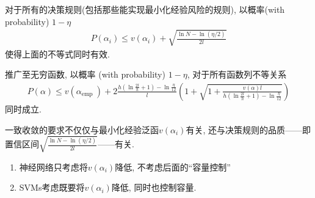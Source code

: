 \documentclass[compress,10pt,dvipsnames,notheorems]{beamer} %
\begin{document}
\begin{frame}
\begin{solu}
对于所有的决策规则(包括那些能实现最小化经验风险的规则), 以概率(with probability) $1-\eta$
\begin{align*}
P\left(\alpha_{i}\right) \leq v\left(\alpha_{i}\right)+\sqrt{\frac{\ln N-\ln (\eta / 2)}{2 l}}
\end{align*}
使得上面的不等式同时有效.
\end{solu}
\begin{solu}
推广至无穷函数, 以概率 (with probability) $1- \eta$, 对于所有函数列不等关系
\begin{align*}
P(\alpha) \leq v\left(\alpha_{\text {emp }}\right) + 2 \frac{h\left(\ln \frac{2 l}{h}+1\right)-\ln \frac{\eta}{12}}{l}\left(1+\sqrt{1+\frac{v(\alpha) l}{h\left(\ln \frac{2 l}{h}+1\right)-\ln \frac{\eta}{12}}}\right)
\end{align*}
同时成立.
\end{solu}
\begin{solu}
一致收敛的要求不仅仅与最小化经验泛函$v(\alpha_{i})$有关, 还与决策规则的品质——即置信区间$\sqrt{\frac{\ln N-\ln (\eta / 2)}{2 l}}$——有关.
\end{solu}
\begin{solu}
\begin{enumerate}
\item 神经网络只考虑将$v(\alpha_{i})$降低, 不考虑后面的“容量控制”
\item SVMs考虑既要将$v(\alpha_{i})$降低, 同时也控制容量.
\end{enumerate}
\end{solu}
\end{frame}
\end{document}
